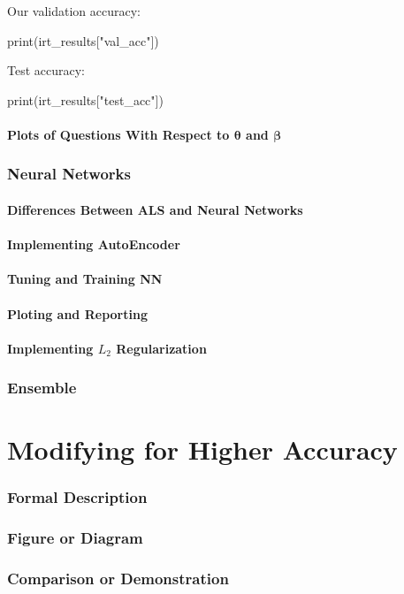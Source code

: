 \documentclass{article}
\begin{document}
    \noindent
    Our validation accuracy:
    \begin{pylabblock}
        print(irt_results["val_acc"])
    \end{pylabblock}
    \printpythontex[verb]

    \medskip

    \noindent
    Test accuracy:
    \begin{pylabblock}
        print(irt_results["test_acc"])
    \end{pylabblock}
    \printpythontex[verb]

    \subsection{Plots of Questions With Respect to $\bm{\theta}$ and $\bm{\beta}$}

    \pagebreak

    \section{Neural Networks}
    \subsection{Differences Between ALS and Neural Networks}
    \subsection{Implementing AutoEncoder}
    \subsection{Tuning and Training NN}
    \subsection{Ploting and Reporting}
    \subsection{Implementing $L_2$ Regularization}

    \pagebreak

    \section{Ensemble}

    \pagebreak

    \part{Modifying for Higher Accuracy}
    \section{Formal Description}
    \section{Figure or Diagram}
    \section{Comparison or Demonstration}
\end{document}
